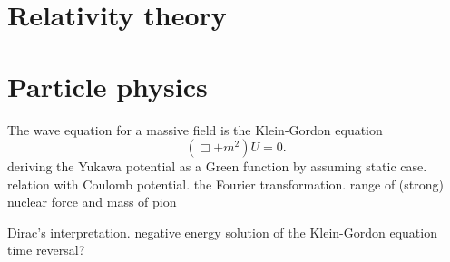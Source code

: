 \documentclass[11pt]{article}
\begin{document}
\section{Relativity theory}

\section{Particle physics}
\begin{prb}
The wave equation for a massive field is the Klein-Gordon equation
\[(\Box+m^2)U=0.\]
\q deriving the Yukawa potential as a Green function by assuming static case.
\q relation with Coulomb potential.
\q the Fourier transformation.
\q range of (strong) nuclear force and mass of pion
\end{prb}

\begin{prb}
Dirac's interpretation.
\q negative energy solution of the Klein-Gordon equation
\q time reversal?
\end{prb}

\begin{prb}
\mtprb
\end{prb}

\begin{prb}
\mtprb
\end{prb}
\end{document}
